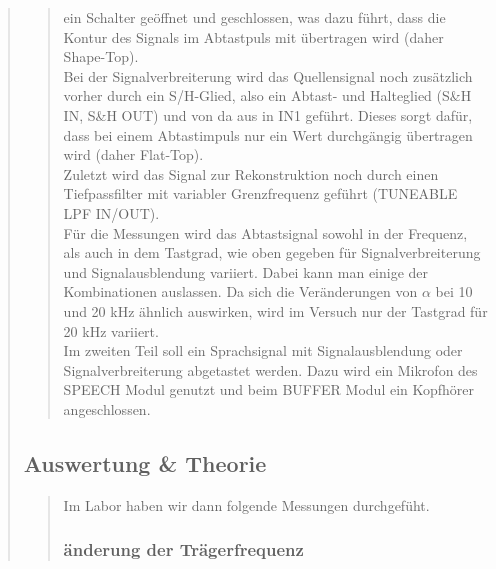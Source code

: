 \begin{quote}
\begin{quote}
     ein Schalter geöffnet und geschlossen, was dazu führt, dass die Kontur
     des Signals im Abtastpuls mit übertragen wird (daher Shape-Top).\\
     Bei der Signalverbreiterung wird das Quellensignal noch zusätzlich vorher
     durch ein S/H-Glied, also ein Abtast- und Halteglied (S&H
     IN, S&H OUT) und von da aus in IN1 geführt. Dieses sorgt dafür, dass bei
     einem Abtastimpuls nur ein Wert durchgängig übertragen wird (daher
     Flat-Top).\\ 
     \noindent\hspace*{4mm}%
     Zuletzt wird das Signal zur Rekonstruktion noch durch einen Tiefpassfilter
     mit variabler Grenzfrequenz geführt (TUNEABLE LPF IN/OUT).\\
     \noindent\hspace*{4mm}%
     Für die Messungen wird das Abtastsignal sowohl in der Frequenz, als auch in
     dem Tastgrad, wie oben gegeben für Signalverbreiterung und
     Signalausblendung variiert. 
     Dabei kann man einige der Kombinationen auslassen. Da sich die
     Veränderungen von $\alpha$ bei 10 und 20 kHz ähnlich auswirken, wird im
     Versuch nur der Tastgrad für 20 kHz variiert.\\
     \noindent\hspace*{4mm}%
     Im zweiten Teil soll ein
     Sprachsignal mit Signalausblendung oder Signalverbreiterung abgetastet werden. Dazu wird ein Mikrofon des SPEECH Modul genutzt und beim BUFFER Modul ein Kopfhörer angeschlossen.
    \end{quote}
    
    
    \subsection{Auswertung \& Theorie}
    \begin{quote}
        
        Im Labor haben wir dann folgende Messungen durchgefüht.
        
        
        
        
        \subsubsection{änderung der Trägerfrequenz}
        \begin{quote}
            

\end{quote}
\end{quote}
\end{quote}
